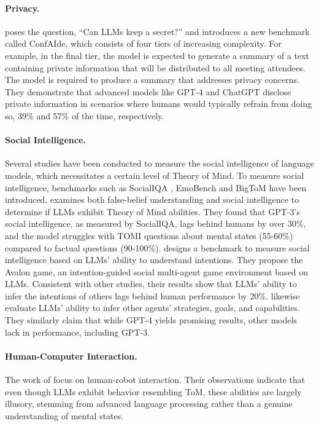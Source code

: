 \paragraph{Privacy.} \citet{mireshghallah2024llmssecrettestingprivacy} poses the question, ``Can LLMs keep a secret?'' and introduces a new benchmark called ConfAIde, which consists of four tiers of increasing complexity. For example, in the final tier, the model is expected to generate a summary of a text containing private information that will be distributed to all meeting attendees. The model is required to produce a summary that addresses privacy concerns. They demonstrate that advanced models like GPT-4 and ChatGPT disclose private information in scenarios where humans would typically refrain from doing so, 39\% and 57\% of the time, respectively.


\paragraph{Social Intelligence.}
Several studies have been conducted to measure the social intelligence of language models, which necessitates a certain level of Theory of Mind. To measure social intelligence, benchmarks such as SocialIQA \cite{sap-etal-2019-social}, EmoBench \cite{sabour-etal-2024-emobench} and BigToM \cite{gandhi2023understandingsocialreasoninglanguage} have been introduced. \citet{sap2023neuraltheoryofmindlimitssocial} examines both false-belief understanding and social intelligence to determine if LLMs exhibit Theory of Mind abilities. They found that GPT-3’s social intelligence, as measured by SocialIQA, lags behind humans by over 30\%, and the model struggles with TOMI questions about mental states (55-60\%) compared to factual questions (90-100\%). \citet{liu2024interintentinvestigatingsocialintelligence} designs a benchmark to measure social intelligence based on LLMs' ability to understand intentions. They propose the Avalon game, an intention-guided social multi-agent game environment based on LLMs. Consistent with other studies, their results show that LLMs' ability to infer the intentions of others lags behind human performance by 20\%. \citet{cross2024hypotheticalmindsscaffoldingtheory} likewise evaluate LLMs' ability to infer other agents' strategies, goals, and capabilities. They similarly claim that while GPT-4 yields promising results, other models lack in performance, including GPT-3.


\paragraph{Human-Computer Interaction.} The work of \citet{Verma_2024} focus on human-robot interaction. Their observations indicate that even though LLMs exhibit behavior resembling ToM, these abilities are largely illusory, stemming from advanced language processing rather than a genuine understanding of mental states.

